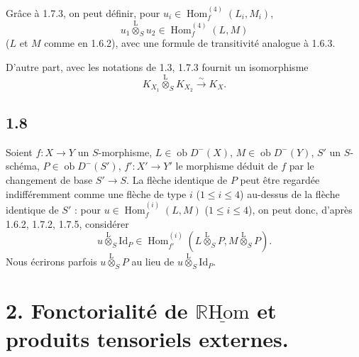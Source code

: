 \documentclass[11pt]{article}
\DeclareMathOperator{\Hom}{Hom}
\newcommand{\R}{\mathbb{R}}\newcommand{\RHomCore}{\mathbb{R}\mathrm{Hom}}
\newcommand{\ob}{\operatorname{ob}}
\providecommand{\RHom}{\RHomCore}
\providecommand{\uRHom}{\underline{\RHom}}
\providecommand{\Id}{\mathrm{Id}}
\providecommand{\RHom}{\RHomCore}
\providecommand{\Hom}{\operatorname{Hom}}
\providecommand{\ob}{\operatorname{ob}}
\providecommand{\RHom}{\R\mathcal{H}om}
\providecommand{\R}{\mathrm R}
\providecommand{\RHom}{\RHomCore}
\providecommand{\Hom}{\operatorname{Hom}}
\begin{document}
Grâce à 1.7.3, on peut définir, pour $u_i\in\Hom_f^{(4)}(L_i,M_i)$,
\begin{equation}\tag{1.7.5}
u_1\overset{\mathrm{L}}{\otimes}_{S}u_2\in\Hom_f^{(4)}(L,M)
\end{equation}
($L$ et $M$ comme en 1.6.2), avec une formule de transitivité analogue à 1.6.3.

D'autre part, avec les notations de 1.3, 1.7.3 fournit un isomorphisme
\begin{equation}\tag{1.7.6}
K_{X_1}\overset{\mathrm{L}}{\otimes}_{S}K_{X_2}\xrightarrow{\sim}K_X.
\end{equation}

\subsection*{1.8}
Soient $f:X\to Y$ un $S$-morphisme, $L\in\ob D^{-}(X)$, $M\in\ob D^{-}(Y)$, $S'$ un $S$-schéma, $P\in\ob D^{-}(S')$, $f':X'\to Y'$ le morphisme déduit de $f$ par le changement de base $S'\to S$. La flèche identique de $P$ peut être regardée indifféremment comme une flèche de type $i$ ($1\leq i\leq4$) au-dessus de la flèche identique de $S'$ : pour $u\in\Hom_f^{(i)}(L,M)$ ($1\leq i\leq4$), on peut donc, d'après 1.6.2, 1.7.2, 1.7.5, considérer
\begin{equation}\tag{1.8.1}
u\overset{\mathrm{L}}{\otimes}_{S}\Id_P\in\Hom_{f'}^{(i)}(L\overset{\mathrm{L}}{\otimes}_{S}P,M\overset{\mathrm{L}}{\otimes}_{S}P).
\end{equation}
Nous écrirons parfois $u\overset{\mathrm{L}}{\otimes}_{S}P$ au lieu de $u\overset{\mathrm{L}}{\otimes}_{S}\Id_P$.

\section*{2. Fonctorialité de \texorpdfstring{$\uRHom$}{RHom} et produits tensoriels externes.}
\end{document}
